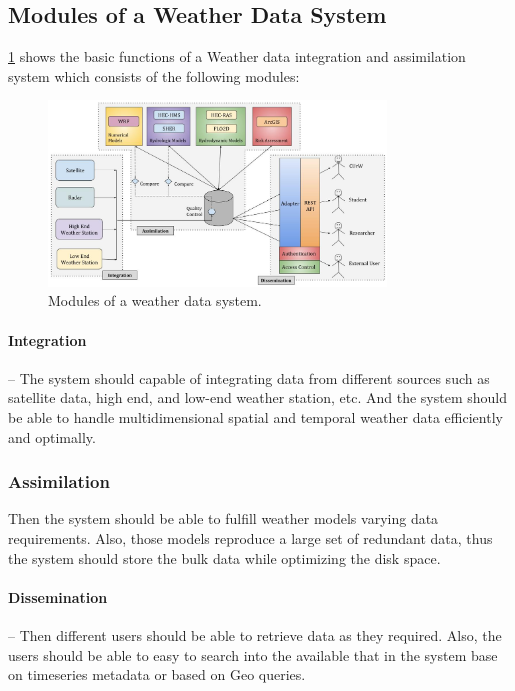 \subsection{Modules of a Weather Data System}
\label{subse:modules_weather_data_integration_sys}

\cref{fi:wdia_components} shows the basic functions of a Weather data integration and assimilation system which consists of the following modules:
\begin{figure}[htbp]
\centerline{\includegraphics[width=0.8\textwidth]{method/misc/weather_data_system_components.jpg}}
\caption{Modules of a weather data system.}
\label{fi:wdia_components}
\end{figure}

\paragraph{Integration}-- The system should capable of integrating data from different sources such as satellite data, high end, and low-end weather station, etc. And the system should be able to handle multidimensional spatial and temporal weather data efficiently and optimally. 
\subsubsection{Assimilation}
Then the system should be able to fulfill weather models varying data requirements. Also, those models reproduce a large set of redundant data, thus the system should store the bulk data while optimizing the disk space.
\paragraph{Dissemination}-- Then different users should be able to retrieve data as they required. Also, the users should be able to easy to search into the available that in the system base on timeseries metadata or based on Geo queries.



